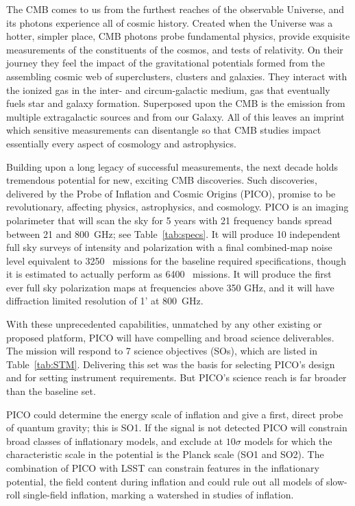 \documentclass[PICOReport.tex]{subfiles}
\begin{document}

The \ac{CMB} comes to us from the furthest reaches of the observable Universe, and its photons experience all of cosmic history.  Created when the Universe was a hotter, simpler place, CMB photons probe fundamental physics, provide exquisite measurements of the constituents of the cosmos, and tests of relativity.  On their journey they feel the impact of the gravitational potentials formed from the assembling cosmic web of superclusters, clusters and galaxies.  They interact with the ionized gas in the inter- and circum-galactic medium, gas that eventually fuels star and galaxy formation.  Superposed upon the CMB is the emission from multiple extragalactic sources and from our Galaxy.  All of this leaves an imprint which sensitive measurements can disentangle so that CMB studies impact essentially every aspect of cosmology and astrophysics.

Building upon a long legacy of successful measurements, the next decade holds tremendous potential for new, exciting \ac{CMB} discoveries.  Such discoveries, delivered by the Probe of Inflation and Cosmic Origins (PICO), promise to be revolutionary, affecting physics, astrophysics, and cosmology. PICO is an imaging polarimeter that will scan the sky for 5 years with 21 frequency bands spread between 21 and 800~GHz; see Table~\ref{tab:specs}. It will produce 10 independent full sky surveys of intensity and polarization with a final combined-map noise level equivalent to 3250 \planck\ missions for the baseline required specifications, though it is estimated to actually perform as 6400 \planck\ missions.  It will produce the first ever full sky polarization maps at frequencies above 350 GHz, and it will have diffraction limited resolution of 1' at 800~GHz. 

With these unprecedented capabilities, unmatched by any other existing or proposed platform, PICO will have compelling and broad science deliverables. The mission will respond to 7 science objectives (SOs), which are listed in Table~\ref{tab:STM}. Delivering this set was the basis for selecting PICO's design and for setting instrument requirements. But PICO's science reach is far broader than the baseline set. 

PICO could determine the energy scale of inflation and give a first, direct probe of quantum gravity; this is SO1. If the signal is not detected PICO will constrain broad classes of inflationary models, and exclude at $10\sigma$ models for which the characteristic scale in the potential is the Planck scale (SO1 and SO2). The combination of PICO with LSST can constrain features in the inflationary potential, the field content during inflation and could rule out all models of slow-roll single-field inflation, marking a watershed in studies of inflation. 
\end{document}
